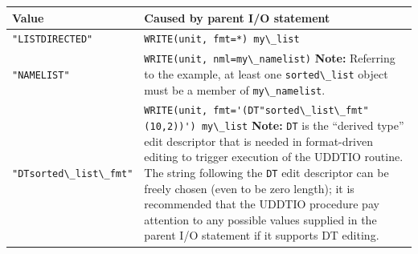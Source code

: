\documentclass[
  paper=a4,
  ,captions=tableheading
]{scrartcl}
\newcommand{\passthrough}[1]{#1}
\begin{document}
\begin{longtable}[]{@{}
  >{\raggedright\arraybackslash}p{}
  >{\raggedright\arraybackslash}p{}@{}}
\toprule\noalign{}
\begin{minipage}[b]{\linewidth}\raggedright
Value
\end{minipage} & \begin{minipage}[b]{\linewidth}\raggedright
Caused by parent I/O statement
\end{minipage} \\
\midrule\noalign{}
\endhead
\bottomrule\noalign{}
\endlastfoot
\passthrough{\lstinline!"LISTDIRECTED"!} &
\passthrough{\lstinline!WRITE(unit, fmt=*) my\_list!} \\
\passthrough{\lstinline!"NAMELIST"!} &
\passthrough{\lstinline!WRITE(unit, nml=my\_namelist)!} \textbf{Note:}
Referring to the example, at least one
\passthrough{\lstinline!sorted\_list!} object must be a member of
\passthrough{\lstinline!my\_namelist!}. \\
\passthrough{\lstinline!"DTsorted\_list\_fmt"!} &
\passthrough{\lstinline!WRITE(unit, fmt='(DT"sorted\_list\_fmt"(10,2))') my\_list!}
\textbf{Note:} \passthrough{\lstinline!DT!} is the ``derived type'' edit
descriptor that is needed in format-driven editing to trigger execution
of the UDDTIO routine. The string following the
\passthrough{\lstinline!DT!} edit descriptor can be freely chosen (even
to be zero length); it is recommended that the UDDTIO procedure pay
attention to any possible values supplied in the parent I/O statement if
it supports DT editing. \\
\end{longtable}
\end{document}
